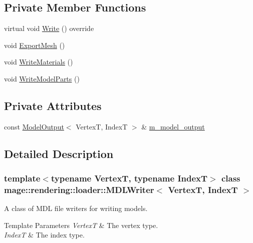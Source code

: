\subsection*{Private Member Functions}
\begin{DoxyCompactItemize}
\item 
virtual void \mbox{\hyperlink{classmage_1_1rendering_1_1loader_1_1_m_d_l_writer_a1506b1a09c7a7c1ee1e206cc6d5cd0e0}{Write}} () override
\item 
void \mbox{\hyperlink{classmage_1_1rendering_1_1loader_1_1_m_d_l_writer_a77189702168fc4ea6b9482a9efec788f}{Export\+Mesh}} ()
\item 
void \mbox{\hyperlink{classmage_1_1rendering_1_1loader_1_1_m_d_l_writer_afcd1eca27b5854b0f0406dbcae135499}{Write\+Materials}} ()
\item 
void \mbox{\hyperlink{classmage_1_1rendering_1_1loader_1_1_m_d_l_writer_a8fcd997a51d7a46149596d332ebdb8e1}{Write\+Model\+Parts}} ()
\end{DoxyCompactItemize}
\subsection*{Private Attributes}
\begin{DoxyCompactItemize}
\item 
const \mbox{\hyperlink{structmage_1_1rendering_1_1_model_output}{Model\+Output}}$<$ VertexT, IndexT $>$ \& \mbox{\hyperlink{classmage_1_1rendering_1_1loader_1_1_m_d_l_writer_aefa6dfd7c4d7e2abe92e9c93b1e8638c}{m\+\_\+model\+\_\+output}}
\end{DoxyCompactItemize}


\subsection{Detailed Description}
\subsubsection*{template$<$typename VertexT, typename IndexT$>$\newline
class mage\+::rendering\+::loader\+::\+M\+D\+L\+Writer$<$ Vertex\+T, Index\+T $>$}

A class of M\+DL file writers for writing models.


\begin{DoxyTemplParams}{Template Parameters}
{\em VertexT} & The vertex type. \\
\hline
{\em IndexT} & The index type. \\
\hline
\end{DoxyTemplParams}



